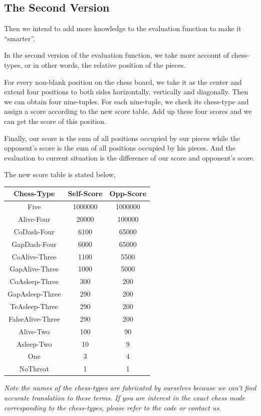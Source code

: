 \documentclass[12pt,a4paper]{article}
\begin{document}
\subsection{The Second Version}
Then we intend to add more knowledge to the evaluation function to make it ``smarter''.

In the second version of the evaluation function, we take more account of chess-types, or in other words, the relative position of the pieces.

For every non-blank position on the chess board, we take it as the center and extend four positions to both sides horizontally, vertically and diagonally. Then we can obtain four nine-tuples. For each nine-tuple, we check its chess-type and assign a score according to the new score table. Add up these four scores and we can get the score of this position.

Finally, our score is the sum of all positions occupied by our pieces while the opponent's score is the sum of all positions occupied by his pieces. And the evaluation to current situation is the difference of our score and opponent's score.

The new score table is stated below,
\begin{table}[h]
\centering
\begin{tabular}{c|c|c}
\hline
Chess-Type&Self-Score&Opp-Score  \\
\hline
Five&1000000&1000000\\
Alive-Four&20000&100000\\
CoDash-Four&6100&65000\\
GapDash-Four&6000&65000\\
CoAlive-Three&1100&5500\\
GapAlive-Three&1000&5000\\
CoAsleep-Three&300&200\\
GapAsleep-Three&290&200\\
TeAsleep-Three&290&200\\
FalseAlive-Three&290&200\\
Alive-Two&100&90\\
Asleep-Two&10&9\\
One&3&4\\
NoThreat&1&1\\
\hline
\end{tabular}
\end{table}

\noindent\begin{small}\emph{Note the names of the chess-types are fabricated by ourselves because we can't find accurate translation to these terms. If you are interest in the exact chess mode corresponding to the chess-types, please refer to the code or contact us.}\end{small}
\end{document}
